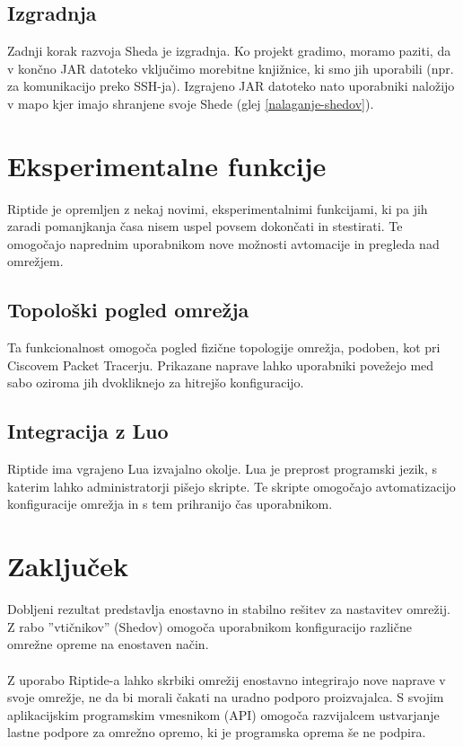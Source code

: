 \documentclass[12pt]{article}
\begin{document}
\subsection{Izgradnja}
Zadnji korak razvoja Sheda je izgradnja. Ko projekt gradimo, moramo paziti,
da v končno JAR datoteko vključimo morebitne knjižnice, ki smo jih
uporabili (npr. za komunikacijo preko SSH-ja). Izgrajeno JAR datoteko nato
uporabniki naložijo v mapo kjer imajo shranjene svoje Shede
(glej \ref{nalaganje-shedov}).
\newpage

\section{Eksperimentalne funkcije}
Riptide je opremljen z nekaj novimi, eksperimentalnimi funkcijami, ki pa
jih zaradi pomanjkanja časa nisem uspel povsem dokončati in stestirati. Te
omogočajo naprednim uporabnikom nove možnosti avtomacije in pregleda nad
omrežjem.

\subsection{Topološki pogled omrežja}
Ta funkcionalnost omogoča pogled fizične topologije omrežja, podoben, kot
pri Ciscovem Packet Tracerju. Prikazane naprave lahko uporabniki povežejo
med sabo oziroma jih dvokliknejo za hitrejšo konfiguracijo.

\subsection{Integracija z Luo}
Riptide ima vgrajeno Lua izvajalno okolje. Lua je preprost programski jezik,
s katerim lahko administratorji pišejo skripte. Te skripte omogočajo
avtomatizacijo konfiguracije omrežja in s tem prihranijo čas uporabnikom.
\newpage

\section{Zaključek}
Dobljeni rezultat predstavlja enostavno in stabilno rešitev za nastavitev
omrežij. Z rabo ''vtičnikov'' (Shedov) omogoča uporabnikom konfiguracijo
različne omrežne opreme na enostaven način.
\\\\
Z uporabo Riptide-a lahko skrbiki omrežij enostavno integrirajo nove
naprave v svoje omrežje, ne da bi morali čakati na uradno podporo
proizvajalca. S svojim aplikacijskim programskim vmesnikom (API) omogoča
razvijalcem ustvarjanje lastne podpore za omrežno opremo, ki je programska
oprema še ne podpira.
\newpage
\end{document}
